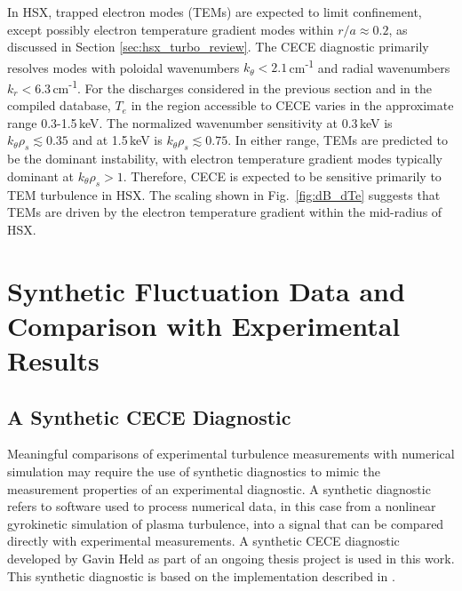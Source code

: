 \documentclass[%
 aip,
 amsmath,amssymb,
 reprint,%
]{revtex4-1}
\begin{document}
In HSX, trapped electron modes (TEMs) are expected to limit confinement, except possibly electron temperature gradient modes within $r/a\approx0.2$, as discussed in Section \ref{sec:hsx_turbo_review}. The CECE diagnostic primarily resolves modes with poloidal wavenumbers $k_\theta < 2.1$\,cm\textsuperscript{-1} and radial wavenumbers $k_r < 6.3$\,cm\textsuperscript{-1}. For the discharges considered in the previous section and in the compiled database, $T_e$ in the region accessible to CECE varies in the approximate range 0.3-1.5\,keV. The normalized wavenumber sensitivity at 0.3\,keV is $k_\theta \rho_s \lesssim 0.35$ and at 1.5\,keV is $k_\theta \rho_s \lesssim 0.75$. In either range, TEMs are predicted to be the dominant instability, with electron temperature gradient modes typically dominant at $k_\theta \rho_s > 1$. Therefore, CECE is expected to be sensitive primarily to TEM turbulence in HSX. The scaling shown in Fig.\ \ref{fig:dB_dTe} suggests that TEMs are driven by the electron temperature gradient within the mid-radius of HSX.


\section{\label{sec:gkcompare} Synthetic Fluctuation Data and Comparison with Experimental Results}

\subsection{A Synthetic CECE Diagnostic} \label{sec:synth_diag}
Meaningful comparisons of experimental turbulence measurements with numerical simulation may require the use of synthetic diagnostics to mimic the measurement properties of an experimental diagnostic. A synthetic diagnostic refers to software used to process numerical data, in this case from a nonlinear gyrokinetic simulation of plasma turbulence, into a signal that can be compared directly with experimental measurements. A synthetic CECE diagnostic developed by Gavin Held as part of an ongoing thesis project is used in this work. This synthetic diagnostic is based on the implementation described in \cite{holland2009implementation}.
\end{document}
